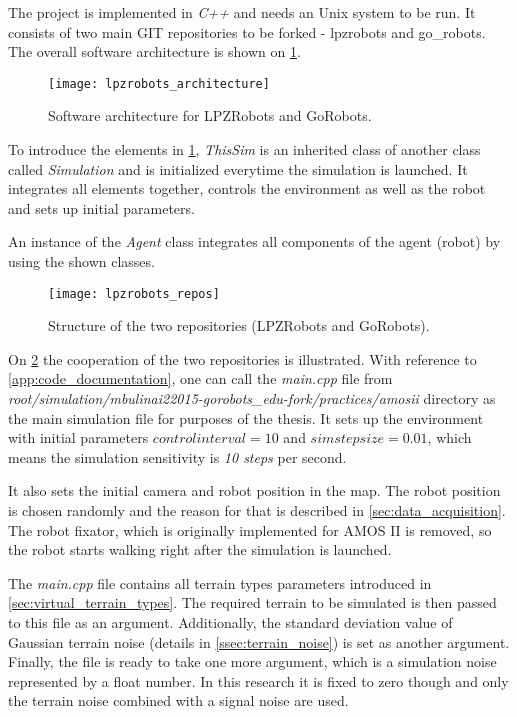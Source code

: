The project is implemented in \textit{C++} and needs an Unix system to be run. It consists of two main GIT repositories to be forked - lpzrobots and go\_robots. The overall software architecture is shown on \cref{img:lpzrobots_architecture}.

\begin{figure}[H]
  \centering
  \texttt{[image: lpzrobots\_architecture]}
  \caption{Software architecture for LPZRobots and GoRobots. \citep{misc:lpzrobots}}
  \label{img:lpzrobots_architecture}
\end{figure}

To introduce the elements in \cref{img:lpzrobots_architecture}, \textit{ThisSim} is an inherited class of another class called \textit{Simulation} and is initialized everytime the simulation is launched. It integrates all elements together, controls the environment as well as the robot and sets up initial parameters.

An instance of the \textit{Agent} class integrates all components of the agent (robot) by using the shown classes.

\begin{figure}[H]
  \centering
  \texttt{[image: lpzrobots\_repos]}
  \caption{Structure of the two repositories (LPZRobots and GoRobots). \citep{misc:lpzrobots}}
  \label{img:lpzrobots_repos}
\end{figure}

On \cref{img:lpzrobots_repos} the cooperation of the two repositories is illustrated. With reference to \cref{app:code_documentation}, one can call the \textit{main.cpp} file from \textit{root/simulation/mbulinai22015-gorobots\_edu-fork/practices/amosii} directory as the main simulation file for purposes of the thesis. It sets up the environment with initial parameters $ controlinterval = 10 $ and $ simstepsize = 0.01 $, which means the simulation sensitivity is \textit{10 steps} per second.

It also sets the initial camera and robot position in the map. The robot position is chosen randomly and the reason for that is described in \cref{sec:data_acquisition}. The robot fixator, which is originally implemented for AMOS II is removed, so the robot starts walking right after the simulation is launched.

The \textit{main.cpp} file contains all terrain types parameters introduced in \cref{sec:virtual_terrain_types}. The required terrain to be simulated is then passed to this file as an argument. Additionally, the standard deviation value of Gaussian terrain noise (details in \cref{ssec:terrain_noise}) is set as another argument. Finally, the file is ready to take one more argument, which is a simulation noise represented by a float number. In this research it is fixed to zero though and only the terrain noise combined with a signal noise are used.

